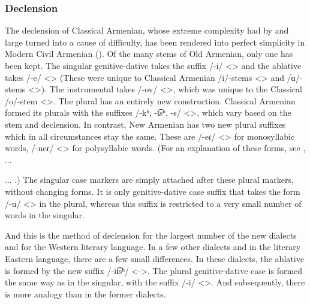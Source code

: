 
\subsubsection{Declension}\label{section:introadjarian:differences:morpho:declension}


The declension of Classical Armenian, whose extreme complexity had by and large turned into a cause of difficulty, has been rendered into perfect simplicity in Modern Civil Armenian (). Of the many stems of Old Armenian, only one has been kept. The singular genitive-dative takes the suffix /-i/ <> and the ablative takes /-e/ <> (These were unique to Classical Armenian /i/-stems <> and /ɑ/-stems <>). The instrumental takes /-ov/ <>, which was unique to the Classical /o/-stem <>. The plural has an entirely new construction. Classical Armenian formed its plurals with the suffixes /-kʰ, -t͡sʰ, -s/ <>, which vary based on the stem and declension. In contrast, New Armenian has two new plural suffixes which in all circumstances stay the same. These are /-eɾ/ <> for monosyllabic words, /-neɾ/ <> for polysyllabic words. (For an explanation of these forms, see \citet[169]{Karst-1901-MiddleArmenain}, ... 



\begin{adjarianpage}\label{page:21}\end{adjarianpage}%

... \citet[456ff]{Pedersen1906Armenischundnachbarsprachen}.) The singular case markers are simply attached after these plural markers, without changing forms. It is only genitive-dative case suffix that takes the form /-u/ <> in the plural, whereas this suffix is restricted to a very small number of words in the singular. 

And this is the method of declension for the largest number of the new dialects and for the Western literary language. In a few other dialects and in the literary Eastern language, there are a few small differences. In these dialects, the ablative is formed by the new suffix /-it͡sʰ/ <->. The plural genitive-dative case is formed the same way as in the singular, with the suffix /-i/ <>. And subsequently, there is more analogy than in the former dialects. 

